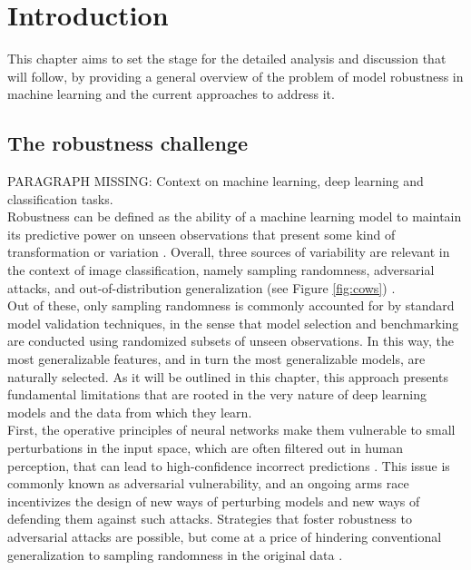 \chapter{Introduction}\label{sec:introduction}

This chapter aims to set the stage for the detailed analysis and discussion that will follow, by 
providing a general overview of the problem of model robustness in 
machine learning and the current approaches to address it.

\section{The robustness challenge}\label{sec:motivation}

PARAGRAPH MISSING: Context on machine learning, deep learning and classification tasks. \\

Robustness can be defined as the ability of a machine learning 
model to maintain its predictive power on unseen observations that present 
some kind of transformation or variation \cite{quinonero-candelaDatasetShiftMachine2009}.
Overall, three sources of variability are relevant in the context
of image classification, namely sampling randomness, adversarial
attacks, and out-of-distribution generalization (see Figure \ref{fig:cows}) 
\cite{buhmannPosteriorAgreementModel2022}. \\

Out of these, only sampling randomness is commonly accounted for by 
standard model validation techniques, in the sense that model selection 
and benchmarking are conducted using randomized subsets of unseen observations. 
In this way, the most generalizable features, and in turn the most generalizable 
models, are naturally selected. As it will be outlined in this chapter, 
this approach presents fundamental limitations
that are rooted in the very nature of deep learning models and
the data from which they learn. \\

First, the operative principles of neural networks make them vulnerable
to small perturbations in the input space, which are
often filtered out in human perception, that can lead to high-confidence
incorrect predictions \cite{szegedyIntriguingPropertiesNeural2014}.
This issue is commonly known as adversarial
vulnerability, and an ongoing arms race incentivizes the design 
of new ways of perturbing models and new ways of defending them
against such attacks. Strategies 
that foster robustness to adversarial attacks are possible, but
come at a price of hindering conventional generalization to 
sampling randomness in the original data \cite{tsiprasRobustnessMayBe2019}. \\

